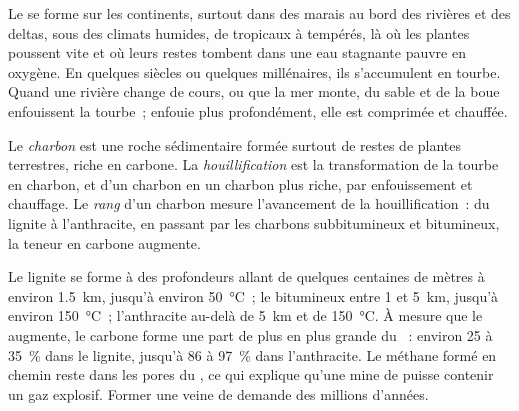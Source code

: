 Le  se forme sur les continents, surtout dans des marais au bord des
rivières et des deltas, sous des climats humides, de tropicaux à tempérés,
là où les plantes poussent vite et où leurs restes tombent dans une eau
stagnante pauvre en oxygène. En quelques siècles ou quelques millénaires,
ils s'accumulent en tourbe. Quand une rivière change de cours, ou que la
mer monte, du sable et de la boue enfouissent la tourbe~; enfouie plus
profondément, elle est comprimée et chauffée.

\begin{definition}\label{def:g11:fossil-fuel-geology:coal}
Le \emph{charbon} est une roche sédimentaire formée surtout
de restes de plantes terrestres, riche en carbone. La
\emph{houillification} est la transformation de la
tourbe en charbon, et d'un charbon en un charbon plus riche, par
enfouissement et chauffage. Le \emph{rang} d'un
charbon mesure l'avancement de la houillification~: du lignite à
l'anthracite, en passant par les charbons subbitumineux et bitumineux, la
teneur en carbone augmente.
\end{definition}

Le lignite se forme à des profondeurs allant de quelques centaines de
mètres à environ \qty{1.5}{km}, jusqu'à environ \qty{50}{\degreeCelsius}~;
le  bitumineux entre 1 et \qty{5}{km}, jusqu'à environ
\qty{150}{\degreeCelsius}~; l'anthracite au-delà de \qty{5}{km} et de
\qty{150}{\degreeCelsius}. À mesure que le  augmente, le carbone forme
une part de plus en plus grande du ~: environ 25 à
\qty{35}{\percent} dans le lignite, jusqu'à 86 à \qty{97}{\percent} dans
l'anthracite. Le méthane formé en chemin reste dans les pores du ,
ce qui explique qu'une mine de  puisse contenir un gaz explosif.
Former une veine de  demande des millions d'années.

